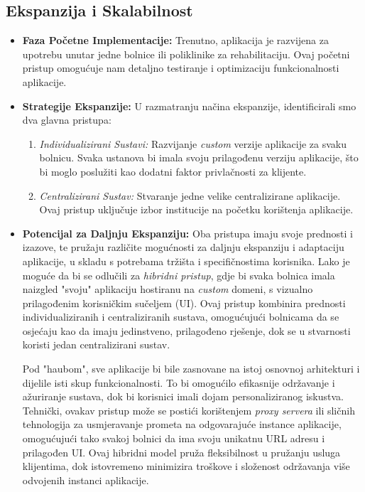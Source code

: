         \subsection*{Ekspanzija i Skalabilnost}
        \begin{itemize}
            \item \textbf{Faza Početne Implementacije:} Trenutno, aplikacija je razvijena za upotrebu unutar jedne bolnice ili poliklinike za rehabilitaciju. Ovaj početni pristup omogućuje nam detaljno testiranje i optimizaciju funkcionalnosti aplikacije.
            
            \item \textbf{Strategije Ekspanzije:} U razmatranju načina ekspanzije, identificirali smo dva glavna pristupa:
                \begin{enumerate}
                    \item \textit{Individualizirani Sustavi:} Razvijanje \textit{custom} verzije aplikacije za svaku bolnicu. Svaka ustanova bi imala svoju prilagođenu verziju aplikacije, što bi moglo poslužiti kao dodatni faktor privlačnosti za klijente.
                    
                    \item \textit{Centralizirani Sustav:} Stvaranje jedne velike centralizirane aplikacije. Ovaj pristup uključuje izbor institucije na početku korištenja aplikacije.
                \end{enumerate}
            
            \item \textbf{Potencijal za Daljnju Ekspanziju:} Oba pristupa imaju svoje prednosti i izazove, te pružaju različite mogućnosti za daljnju ekspanziju i adaptaciju aplikacije, u skladu s potrebama tržišta i specifičnostima korisnika. Lako je moguće da bi se odlučili za \textit{hibridni pristup}, gdje bi svaka bolnica imala naizgled "svoju" aplikaciju hostiranu na \textit{custom} domeni, s vizualno prilagođenim korisničkim sučeljem (UI). Ovaj pristup kombinira prednosti individualiziranih i centraliziranih sustava, omogućujući bolnicama da se osjećaju kao da imaju jedinstveno, prilagođeno rješenje, dok se u stvarnosti koristi jedan centralizirani sustav.

            Pod "haubom", sve aplikacije bi bile zasnovane na istoj osnovnoj arhitekturi i dijelile isti skup funkcionalnosti. To bi omogućilo efikasnije održavanje i ažuriranje sustava, dok bi korisnici imali dojam personaliziranog iskustva. Tehnički, ovakav pristup može se postići korištenjem \textit{proxy servera} ili sličnih tehnologija za usmjeravanje prometa na odgovarajuće instance aplikacije, omogućujući tako svakoj bolnici da ima svoju unikatnu URL adresu i prilagođen UI. Ovaj hibridni model pruža fleksibilnost u pružanju usluga klijentima, dok istovremeno minimizira troškove i složenost održavanja više odvojenih instanci aplikacije.

            \end{itemize}
            
